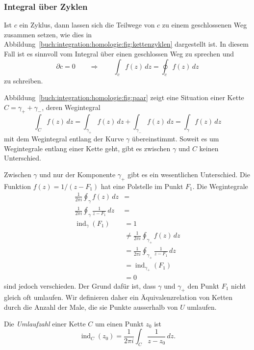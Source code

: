 %
%
\subsubsection{Integral über Zyklen}
Ist $c$ ein Zyklus, dann lassen sich die Teilwege von $c$ zu einem
geschlossenen Weg zusammen setzen, wie dies in
Abbildung~\ref{buch:integration:homologie:fig:kettenzyklen}
dargestellt ist.
In diesem Fall ist es sinnvoll vom Integral über einen geschlossen
Weg zu sprechen und
\[
\partial c = 0
\qquad\Rightarrow\qquad
\int_c f(z)\,dz
=
\oint_c f(z)\,dz
\]
zu schreiben.

Abbildung~\ref{buch:integration:homologie:fig:paar}
zeigt eine Situation einer Kette $C=\gamma_++\gamma_-$, deren
Wegintegral
\[
\int_C f(z)\,dz
=
\int_{\gamma_+} f(z)\,dz
+
\int_{\gamma_-} f(z)\,dz
=
\int_{\gamma} f(z)\,dz
\]
mit dem Wegintegral entlang der Kurve $\gamma$ übereinstimmt.
Soweit es um Wegintegrale entlang einer Kette geht, gibt es 
zwischen $\gamma$ und $C$ keinen Unterschied.

Zwischen $\gamma$ und nur der Komponente $\gamma_+$ gibt es
ein wesentlichen Unterschied.
Die Funktion $f(z) = 1/(z-F_1)$ hat eine Polstelle im Punkt $F_1$.
Die Wegintegrale
\begin{align*}
\frac{1}{2\pi i}
\oint_\gamma f(z)\,dz
&=
\\
\frac{1}{2\pi i}
\oint_\gamma \frac{1}{z-F_1}\,dz
&=
\\
\operatorname{ind}_\gamma(F_1)
&=
1
\\
&\ne
\frac{1}{2\pi i}
\oint_{\gamma_+} f(z)\,dz
\\
&=
\frac{1}{2\pi i}
\oint_{\gamma_+} \frac{1}{z-F_1}\,dz
\\
&=
\operatorname{ind}_{\gamma_+}(F_1)
\\
&=
0
\end{align*}
sind jedoch verschieden.
Der Grund dafür ist, dass $\gamma$ und $\gamma_+$ den Punkt $F_1$
nicht gleich oft umlaufen.
Wir definieren daher ein Äquivalenzrelation von Ketten durch die
Anzahl der Male, die sie Punkte ausserhalb von $U$ umlaufen.

\begin{definition}
Die \emph{Umlaufzahl} einer Kette $C$ um einen Punkt $z_0$ ist
%
\[
\operatorname{ind}_C(z_0)
=
\frac{1}{2\pi i}
\int_C
\frac{1}{z-z_0}
\,dz.
\]
\end{definition}
